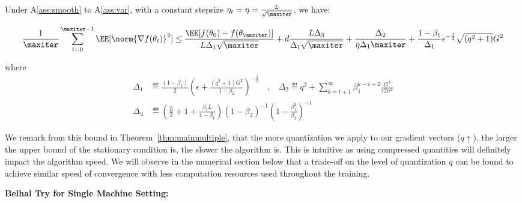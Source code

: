\documentclass[11pt]{article}
\begin{document}
\begin{Theorem}\label{thm:mainmultiple}
Under A\ref{ass:smooth} to A\ref{ass:var}, with a constant stepsize $\eta_t = \eta = \frac{L}{\sqrt{\maxiter}}$, we have:

\begin{equation}
\begin{split}
 \frac{1}{\maxiter}\sum_{t=0}^{\maxiter -1} \EE[\norm{\nabla f(\theta_t)}^2] \leq \frac{\EE[ f(\theta_{0}) - f(\theta_{\maxiter})]}{L \Delta_1 \sqrt{\maxiter}} + 
d\frac{L \Delta_3}{\Delta_1 \sqrt{\maxiter}}  + \frac{\Delta_2}{\eta \Delta_1\maxiter} +\frac{1-\beta_1}{\Delta_1}  \epsilon^{-\frac{1}{2}} \sqrt{(q^2+1)}G^2 
\end{split}
\end{equation}


where 
\begin{equation}
\begin{split}
\Delta_1 & \eqdef \frac{(1-\beta_1)}{2} (\epsilon + \frac{(q^2+1)G^2}{1 - \beta_2})^{-\frac{1}{2}} \quad \textrm{,} \quad \Delta_2 \eqdef q^2 + \sum_{k=t+1}^\infty  \beta_1^{k-t+2}\frac{G^2 }{\epsilon 2n^2}\\
\Delta_3 &\eqdef \left(\frac{L}{2} + 1+ \frac{\beta_1L}{1-\beta_1} \right) (1-\beta_2)^{-1} (1 - \frac{\beta_1^{2}}{\beta_2})^{-1}
\end{split}
\end{equation}
\end{Theorem}

We remark from this bound in Theorem~\ref{thm:mainmultiple}, that the more quantization we apply to our gradient vectors ($q \uparrow$), the larger the upper bound of the stationary condition is, \ie the slower the algorithm is. 
This is intuitive as using compressed quantities will definitely impact the algorithm speed.
We will observe in the numerical section below that a trade-off on the level of quantization $q$ can be found to achieve similar speed of convergence with less computation resources used throughout the training.





\textbf{Belhal Try for Single Machine Setting:}
\end{document}

